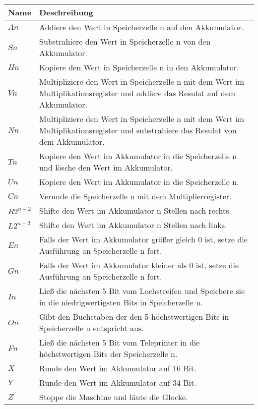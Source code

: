 \documentclass[12pt]{report}
\begin{document}
\begin{table}
  \begin{tabularx}{\columnwidth}{|l|X|}
  \hline
  Name & Deschreibung\\ \hline
  $A n$ & Addiere den Wert in Speicherzelle n auf den Akkumulator.\\ \hline
  $S n$ & Substrahiere den Wert in Speicherzelle n von den Akkumulator.\\ \hline
  $H n$ & Kopiere den Wert in Speicherzelle n in den Akkumulator.\\ \hline
  $V n$ & Multipliziere den Wert in Speicherzelle n mit dem Wert im Multiplikationsregister und addiere das Resulat auf dem Akkumulator.\\ \hline
  $N n$ & Multipliziere den Wert in Speicherzelle n mit dem Wert im Multiplikationsregister und substrahiere das Resulat von dem Akkumulator.\\ \hline
  $T n$ & Kopiere den Wert im Akkumulator in die Speicherzelle n und lösche den Wert im Akkumulator.\\ \hline
  $U n$ & Kopiere den Wert im Akkumulator in die Speicherzelle n.\\ \hline
  $C n$ & Verunde die Speicherzelle n mit dem Multiplierregister.\\ \hline
  $R 2^{n-2}$ & Shifte den Wert im Akkumulator n Stellen nach rechts.\\ \hline
  $L 2^{n-2}$ & Shifte den Wert im Akkumulator n Stellen nach links.\\ \hline
  $E n$ & Falls der Wert im Akkumulator größer gleich 0 ist, setze die Ausführung an Speicherzelle n fort.\\ \hline
  $G n$ & Falls der Wert im Akkumulator kleiner als 0 ist, setze die Ausführung an Speicherzelle n fort.\\ \hline
  $I n$ & Ließ die nächsten 5 Bit vom Lochstreifen und Speichere sie in die niedrigwertigsten Bits in Speicherzelle n.\\ \hline
  $O n$ & Gibt den Buchstaben der den 5 höchstwertigen Bits in Speicherzelle n entspricht aus.\\ \hline
  $F n$ & Ließ die nächsten 5 Bit vom Teleprinter in die höchstwertigen Bits der Speicherzelle n.\\ \hline
  $X$ & Runde den Wert im Akkumulator auf 16 Bit.\\ \hline
  $Y$ & Runde den Wert im Akkumulator auf 34 Bit.\\ \hline
  $Z$ & Stoppe die Maschine und läute die Glocke.\\ \hline
  \end{tabularx}
\end{table}
\end{document}

